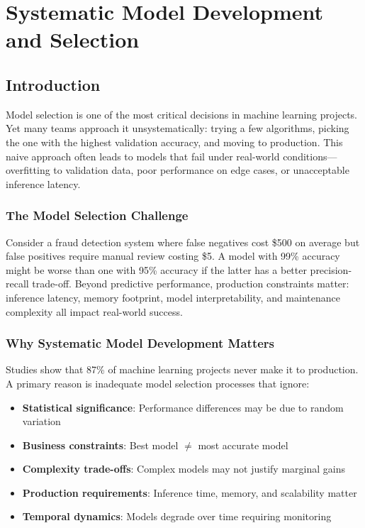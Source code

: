 \chapter{Systematic Model Development and Selection}

\section{Introduction}

Model selection is one of the most critical decisions in machine learning projects. Yet many teams approach it unsystematically: trying a few algorithms, picking the one with the highest validation accuracy, and moving to production. This naive approach often leads to models that fail under real-world conditions---overfitting to validation data, poor performance on edge cases, or unacceptable inference latency.

\subsection{The Model Selection Challenge}

Consider a fraud detection system where false negatives cost \$500 on average but false positives require manual review costing \$5. A model with 99\% accuracy might be worse than one with 95\% accuracy if the latter has a better precision-recall trade-off. Beyond predictive performance, production constraints matter: inference latency, memory footprint, model interpretability, and maintenance complexity all impact real-world success.

\subsection{Why Systematic Model Development Matters}

Studies show that 87\% of machine learning projects never make it to production. A primary reason is inadequate model selection processes that ignore:

\begin{itemize}
    \item \textbf{Statistical significance}: Performance differences may be due to random variation
    \item \textbf{Business constraints}: Best model $\neq$ most accurate model
    \item \textbf{Complexity trade-offs}: Complex models may not justify marginal gains
    \item \textbf{Production requirements}: Inference time, memory, and scalability matter
    \item \textbf{Temporal dynamics}: Models degrade over time requiring monitoring
\end{itemize}

